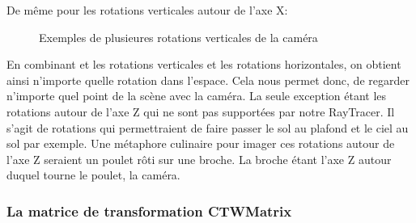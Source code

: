 \documentclass[11pt]{article}
\begin{document}
De même pour les rotations verticales autour de l'axe X:

\begin{figure}[h!]

	\caption{Exemples de plusieures rotations verticales de la caméra}
	\label{rotationCameraX}
\end{figure}
\FloatBarrier

En combinant et les rotations verticales et les rotations horizontales, on obtient ainsi n'importe quelle rotation dans l'espace. Cela nous permet donc, de regarder n'importe quel point de la scène avec la caméra. La seule exception étant les rotations autour de l'axe Z qui ne sont pas supportées par notre RayTracer. Il s'agit de rotations qui permettraient de faire passer le sol au plafond et le ciel au sol par exemple. Une métaphore culinaire pour imager ces rotations autour de l'axe Z seraient un poulet rôti sur une broche. La broche étant l'axe Z autour duquel tourne le poulet, la caméra.

\subsubsection{La matrice de transformation CTWMatrix}
\end{document}
